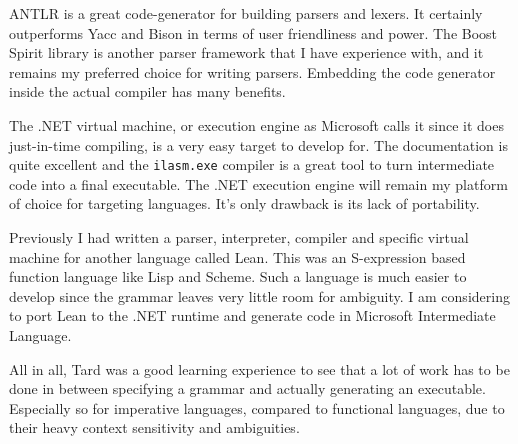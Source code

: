 \documentclass{report}
\begin{document}
ANTLR is a great code-generator for building parsers and lexers. It
certainly outperforms Yacc and Bison in terms of user friendliness
and power. The Boost Spirit library is another parser framework that
I have experience with, and it remains my preferred choice for
writing parsers. Embedding the code generator inside the actual
compiler has many benefits.

The .NET virtual machine, or execution engine as Microsoft calls it
since it does just-in-time compiling, is a very easy target to
develop for. The documentation is quite excellent and the
\texttt{ilasm.exe} compiler is a great tool to turn intermediate
code into a final executable. The .NET execution engine will remain
my platform of choice for targeting languages. It's only drawback is
its lack of portability.

Previously I had written a parser, interpreter, compiler and
specific virtual machine for another language called Lean. This was
an S-expression based function language like Lisp and Scheme. Such a
language is much easier to develop since the grammar leaves very
little room for ambiguity. I am considering to port Lean to the .NET
runtime and generate code in Microsoft Intermediate Language.

All in all, Tard was a good learning experience to see that a lot of
work has to be done in between specifying a grammar and actually
generating an executable. Especially so for imperative languages,
compared to functional languages, due to their heavy context
sensitivity and ambiguities.
\end{document}
